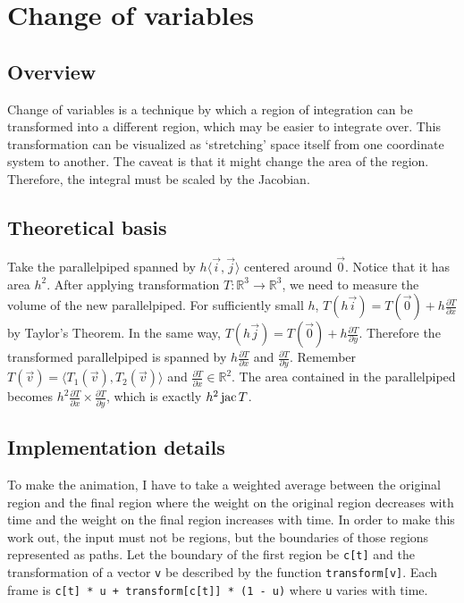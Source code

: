 \section{Change of variables}

\subsection*{Overview}

Change of variables is a technique by which a region of integration can be transformed into a different region, which may be easier to integrate over. This  transformation can be visualized as `stretching' space itself from one coordinate system to another. The caveat is that it might change the area of the region. Therefore, the integral must be scaled by the Jacobian.

\subsection*{Theoretical basis}

Take the parallelpiped spanned by \(h \langle \vec i, \vec j \rangle\) centered around \(\vec 0\). Notice that it has area \(h^2\). After applying transformation \(T : \mathbb R^3 \to \mathbb R^3\), we need to measure the volume of the new parallelpiped. For sufficiently small \(h\), \(T(h \vec i) = T(\vec 0) + h \frac{\partial T}{\partial x}\) by Taylor's Theorem. In the same way, \(T(h \vec j) = T(\vec 0) + h \frac{\partial T}{\partial y}\). Therefore the transformed parallelpiped is spanned by \(h \frac{\partial T}{\partial x}\) and \(\frac{\partial T}{\partial y}\). Remember \(T(\vec v) = \langle T_1(\vec v), T_2(\vec v) \rangle\) and \(\frac{\partial T}{\partial x} \in \mathbb R^2\). The area contained in the parallelpiped becomes \(h^2 \frac{\partial T}{\partial x} \times \frac{\partial T}{\partial y}\), which is exactly \(h^2 \operatorname{jac} T\).

\subsection*{Implementation details}

To make the animation, I have to take a weighted average between the original region and the final region where the weight on the original region decreases with time and the weight on the final region increases with time. In order to make this work out, the input must not be regions, but the boundaries of those regions represented as paths. Let the boundary of the first region be \verb+c[t]+ and the transformation of a vector \verb+v+ be described by the function \verb+transform[v]+. Each frame is \verb;c[t] * u + transform[c[t]] * (1 - u); where \verb+u+ varies with time.

